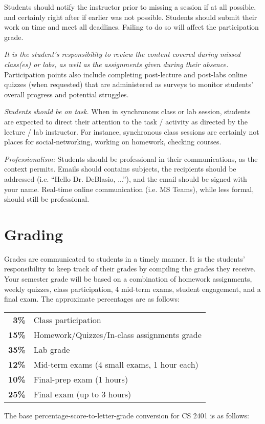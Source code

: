 \documentclass[12pt]{scrartcl}
\begin{document}
Students should notify the instructor prior to missing a session if at all possible, and certainly right after if earlier was not possible. 
Students should submit their work on time and meet all deadlines. Failing to do so will affect the participation grade.


\textit{It is the student's responsibility to review the content covered during missed class(es) or labs, as well as the assignments given during their absence.}
Participation points also include completing post-lecture and post-labs online quizzes (when requested) that are administered as surveys to monitor students’ overall progress and potential struggles.

\textit{Students should be on task.} 
When in synchronous class or lab session, students are expected to direct their attention to the task / activity as directed by the lecture / lab instructor. 
For instance, synchronous class sessions are certainly not places for social-networking, working on homework, checking courses.

\textit{Professionalism:} 
Students should be professional in their communications, as the context permits.
Emails should contains subjects, the recipients should be addressed (i.e. ``Hello Dr. DeBlasio, ...''), and the email should be signed with your name. 
Real-time online communication (i.e. MS Teams), while less formal, should still be professional. 


\section{Grading}

Grades are communicated to students in a timely manner. 
It is the students’ responsibility to keep track of their grades by compiling the grades they receive. 
Your semester grade will be based on a combination of homework assignments, weekly quizzes, class participation, 4 mid-term exams, student engagement, and a final exam. 
The approximate percentages are as follows:
\begin{center}
\begin{tabular}{rl}
\textbf{3\% } & Class participation \\
\textbf{15\% } & Homework/Quizzes/In-class assignments grade\\
\textbf{35\% } & Lab grade\\
\textbf{12\% } & Mid-term exams (4 small exams, 1 hour each) \\
\textbf{10\% } & Final-prep exam (1 hours)\\
\textbf{25\% } & Final exam (up to 3 hours)\\
\end{tabular}
\end{center}
The base percentage-score-to-letter-grade conversion for CS 2401 is as follows: 
\end{document}
